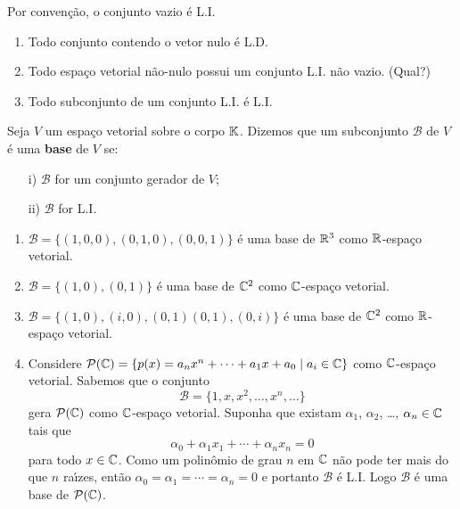 \begin{observacao}\label{conjutoLDLI}
	Por conven\c{c}\~ao, o conjunto vazio \'e L.I.
\end{observacao}

\begin{propriedades}
	\begin{enumerate}[label={\roman*})]
		\item Todo conjunto contendo o vetor nulo \'e L.D.
		\item Todo espa\c{c}o vetorial n\~ao-nulo possui um conjunto L.I. n\~ao vazio. (Qual?)
		\item Todo subconjunto de um conjunto L.I. \'e L.I.
	\end{enumerate}
\end{propriedades}

\begin{definicao}
	Seja $V$ um espa\c{c}o vetorial sobre o corpo $\mathbb{K}$. Dizemos que um subconjunto $\mathcal{B}$ de $V$ \'e uma \textbf{base} de $V$ se:
	\begin{enumerate}
		\item[i)] $\mathcal{B}$ for um conjunto gerador de $V$;
		\item[ii)] $\mathcal{B}$ for L.I.
	\end{enumerate}
\end{definicao}

\begin{exemplo}
	\begin{enumerate}
		\item $\mathcal{B} = \{(1, 0 , 0), (0, 1, 0), (0, 0 ,1)\}$ \'e uma base de $\mathbb{R}^3$ como $\mathbb{R}$-espa\c{c}o vetorial.
		\item $\mathcal{B} = \{(1, 0), (0, 1)\}$ \'e uma base de $\mathbb{C}^2$ como $\mathbb{C}$-espa\c{c}o vetorial.
		\item $\mathcal{B} = \{(1, 0), (i , 0), (0, 1) (0, 1), (0, i)\}$ \'e uma base de $\mathbb{C}^2$ como $\mathbb{R}$-espa\c{c}o vetorial.
		\item Considere $\mathcal{P}(\mathbb{C}) = \{p(x) = a_nx^n + \cdots + a_1x + a_0 \mid a_i \in \mathbb{C}\}$ como $\mathbb{C}$-espa\c{c}o vetorial. Sabemos que o conjunto
		\[
			\mathcal{B} = \{1, x, x^2, \dots, x^n, \dots\}
		\]
		gera $\mathcal{P}(\mathbb{C})$ como $\mathbb{C}$-espa\c{c}o vetorial. Suponha que existam $\alpha_1$, $\alpha_2$, \dots, $\alpha_n \in \mathbb{C}$ tais que
		\[
			\alpha_0 + \alpha_1x_1 + \cdots + \alpha_nx_n = 0
		\]
		para todo $x \in \mathbb{C}$. Como um polin\^omio de grau $n$ em $\mathbb{C}$ n\~ao pode ter mais do que $n$ ra{\'\i}zes, ent\~ao $\alpha_0 = \alpha_1 = \cdots = \alpha_n = 0$ e portanto $\mathcal{B}$ \'e L.I. Logo $\mathcal{B}$ \'e uma base de $\mathcal{P}(\mathbb{C})$.
	\end{enumerate}
\end{exemplo}


